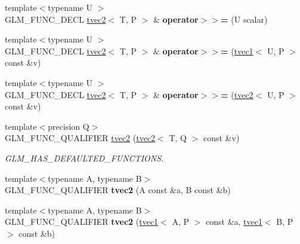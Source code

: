 \begin{DoxyCompactItemize}
\item 
\hypertarget{structglm_1_1tvec2_ae86653af46cd2f8f33888f3e720dceb3}{{\footnotesize template$<$typename U $>$ }\\G\-L\-M\-\_\-\-F\-U\-N\-C\-\_\-\-D\-E\-C\-L \hyperlink{structglm_1_1tvec2}{tvec2}$<$ T, P $>$ \& {\bfseries operator$>$$>$=} (U scalar)}\label{structglm_1_1tvec2_ae86653af46cd2f8f33888f3e720dceb3}

\item 
\hypertarget{structglm_1_1tvec2_a44b9f53542701ce37c0806bc29a7c89c}{{\footnotesize template$<$typename U $>$ }\\G\-L\-M\-\_\-\-F\-U\-N\-C\-\_\-\-D\-E\-C\-L \hyperlink{structglm_1_1tvec2}{tvec2}$<$ T, P $>$ \& {\bfseries operator$>$$>$=} (\hyperlink{structglm_1_1tvec1}{tvec1}$<$ U, P $>$ const \&v)}\label{structglm_1_1tvec2_a44b9f53542701ce37c0806bc29a7c89c}

\item 
\hypertarget{structglm_1_1tvec2_aea51b73efe332b3fae252644ea44dc43}{{\footnotesize template$<$typename U $>$ }\\G\-L\-M\-\_\-\-F\-U\-N\-C\-\_\-\-D\-E\-C\-L \hyperlink{structglm_1_1tvec2}{tvec2}$<$ T, P $>$ \& {\bfseries operator$>$$>$=} (\hyperlink{structglm_1_1tvec2}{tvec2}$<$ U, P $>$ const \&v)}\label{structglm_1_1tvec2_aea51b73efe332b3fae252644ea44dc43}

\item 
\hypertarget{structglm_1_1tvec2_adae9abcd4cbbe61d0c88b6a7b3a0f7ab}{{\footnotesize template$<$precision Q$>$ }\\G\-L\-M\-\_\-\-F\-U\-N\-C\-\_\-\-Q\-U\-A\-L\-I\-F\-I\-E\-R \hyperlink{structglm_1_1tvec2_adae9abcd4cbbe61d0c88b6a7b3a0f7ab}{tvec2} (\hyperlink{structglm_1_1tvec2}{tvec2}$<$ T, Q $>$ const \&v)}\label{structglm_1_1tvec2_adae9abcd4cbbe61d0c88b6a7b3a0f7ab}

\begin{DoxyCompactList}\small\item\em G\-L\-M\-\_\-\-H\-A\-S\-\_\-\-D\-E\-F\-A\-U\-L\-T\-E\-D\-\_\-\-F\-U\-N\-C\-T\-I\-O\-N\-S. \end{DoxyCompactList}\item 
\hypertarget{structglm_1_1tvec2_a995abc8f60875a7a9dc156c78cd558e4}{{\footnotesize template$<$typename A, typename B$>$ }\\G\-L\-M\-\_\-\-F\-U\-N\-C\-\_\-\-Q\-U\-A\-L\-I\-F\-I\-E\-R {\bfseries tvec2} (A const \&a, B const \&b)}\label{structglm_1_1tvec2_a995abc8f60875a7a9dc156c78cd558e4}

\item 
\hypertarget{structglm_1_1tvec2_a3847fd3a8591d6947e7e24398284f09e}{{\footnotesize template$<$typename A, typename B$>$ }\\G\-L\-M\-\_\-\-F\-U\-N\-C\-\_\-\-Q\-U\-A\-L\-I\-F\-I\-E\-R {\bfseries tvec2} (\hyperlink{structglm_1_1tvec1}{tvec1}$<$ A, P $>$ const \&a, \hyperlink{structglm_1_1tvec1}{tvec1}$<$ B, P $>$ const \&b)}\label{structglm_1_1tvec2_a3847fd3a8591d6947e7e24398284f09e}


\end{DoxyCompactItemize}
